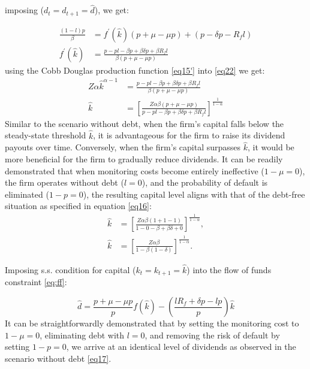 \documentclass[12pt]{report}
\begin{document}
imposing (\(d_t = d_{t+1} =\hat{d}\)), we get:

\begin{align}
    \frac{\left(1-l \right) p}{\beta} &= f^{\prime}(\hat{k})\left({p+\mu-\mu p}\right) + \left({p-\delta p - R_f l}\right) \nonumber\\
    f^{\prime}(\hat{k})&=\frac{p -p l - \beta p + \beta \delta p + \beta R_f l}{\beta \left(p+\mu-\mu p\right)} \label{eq22}
\end{align}
using the Cobb Douglas production function \ref{eq15'} into \ref{eq22} we get:
\begin{align}
    Z \alpha\hat{k}^{\alpha-1} &= \frac{p -p l - \beta p + \beta \delta p + \beta R_f l}{\beta \left(p+\mu-\mu p\right)} \nonumber \\
    \hat{k} &=\left[\frac{Z \alpha \beta \left(p+\mu-\mu p\right)}{p -p l - \beta p + \beta \delta p + \beta R_f l}\right]^{\frac{1}{1-\alpha}} \label{eq23}
\end{align}
Similar to the scenario without debt, when the firm's capital falls below the steady-state threshold \( \hat{k} \), it
is advantageous for the firm to raise its dividend payouts over time. Conversely, when the firm's capital
surpasses \( \hat{k} \), it would be more beneficial for the firm to gradually reduce dividends. It can be readily
demonstrated that when monitoring costs become entirely ineffective (\(1-\mu=0\)), the firm operates without debt
(\(l=0\)), and the probability of default is eliminated (\(1-p=0\)), the resulting capital level aligns with that of the
debt-free situation as specified in equation \ref{eq16}: 
\begin{align*}
    \hat{k} &=\left[\frac{Z \alpha \beta \left(1+1-1\right)}{1 -0 - \beta + \beta \delta + 0}\right]^{\frac{1}{1-\alpha}},\\
    \hat{k} &=\left[\frac{Z \alpha \beta}{1 - \beta(1-\delta)}\right]^{\frac{1}{1-\alpha}}.  
\end{align*}

Imposing s.s. condition for capital (\(k_t=k_{t+1}=\hat{k}\)) into the flow of funds constraint \ref{eq:ff}:

\begin{equation}
    \widehat{d} =\frac{p+\mu-\mu p}{p}f(\hat{k})-\left(\frac{l R_f+\delta p - l p}{p}\right)\hat{k} \label{eq:div_opt_path}
\end{equation}
It can be straightforwardly demonstrated that by setting the monitoring cost to \(1-\mu=0\), eliminating debt
with \(l=0\), and removing the risk of default by setting \(1-p=0\), we arrive at an identical level of dividends as
observed in the scenario without debt \ref{eq17}. 
\end{document}
